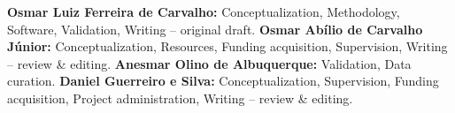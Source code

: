 
\textbf{Osmar Luiz Ferreira de Carvalho:} Conceptualization,
Methodology, Software, Validation, Writing -- original draft.
\textbf{Osmar Ab\'ilio de Carvalho J\'unior:} Conceptualization,
Resources, Funding acquisition, Supervision, Writing -- review \&
editing.
\textbf{Anesmar Olino de Albuquerque:} Validation, Data curation.
\textbf{Daniel Guerreiro e Silva:} Conceptualization, Supervision,
Funding acquisition, Project administration, Writing -- review \&
editing.
